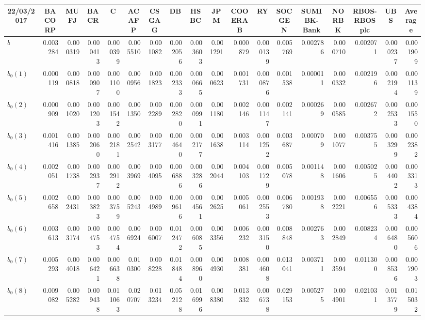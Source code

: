\documentclass[12pt,a4paper]{article}
\theoremstyle{plain}
\numberwithin{equation}{section}
\begin{document}
\begin{table}[t]
\begin{subtable}{.5\textwidth}
{  \begin{tabular}{|l|rrrrrrrrrrrrrrrr|r|}
    \toprule
    \multicolumn{1}{|c|}{22/03/2017} & \multicolumn{1}{c}{BACORP} & \multicolumn{1}{c}{MUFJ} & \multicolumn{1}{c}{BACR} & \multicolumn{1}{c}{C} & \multicolumn{1}{c}{ACAFP} & \multicolumn{1}{c}{CSGAG} & \multicolumn{1}{c}{DB} & \multicolumn{1}{c}{HSBC} & \multicolumn{1}{c}{JPM} & \multicolumn{1}{c}{COOERAB} & \multicolumn{1}{c}{RY} & \multicolumn{1}{c}{SOCGEN} & \multicolumn{1}{c}{SUMIBK-Bank} & \multicolumn{1}{c}{NORBK} & \multicolumn{1}{c}{RBOS-RBOSplc} & \multicolumn{1}{c|}{UBS} & \multicolumn{1}{c|}{\textbf{Average}} \\
    \midrule
     $\hat{b}$     & 0.003284 & 0.000319 & 0.000413 & 0.000399 & 0.005510 & 0.001082 & 0.002056 & 0.003603 & 0.001291 & 0.000879 & 0.000139 & 0.005769 & 0.002786 & 0.000710 & 0.002071 & 0.000237 & 0.001909 \\
     $\hat{b}_0(1)$  & 0.000119 & 0.000818 & 0.000907 & 0.001100 & 0.000956 & 0.001823 & 0.002333 & 0.000665 & 0.000623 & 0.001731 & 0.000876 & 0.001538 & 0.000011 & 0.000332 & 0.002196 & 0.002194 & 0.001139 \\
     $\hat{b}_0(2)$   & 0.000909 & 0.001020 & 0.001203 & 0.001542 & 0.001350 & 0.002289 & 0.002820 & 0.000991 & 0.001180 & 0.002146 & 0.001147 & 0.002141 & 0.000269 & 0.000585 & 0.002672 & 0.002533 & 0.001550 \\
     $\hat{b}_0(3)$  & 0.001416 & 0.001385 & 0.002060 & 0.002181 & 0.002542 & 0.003177 & 0.004640 & 0.002177 & 0.001638 & 0.003114 & 0.001252 & 0.003687 & 0.000709 & 0.001077 & 0.003755 & 0.003299 & 0.002382 \\
    $\hat{b}_0(4)$   & 0.002051 & 0.001738 & 0.002937 & 0.002912 & 0.003969 & 0.004095 & 0.006886 & 0.003286 & 0.002044 & 0.004103 & 0.001729 & 0.005078 & 0.001148 & 0.001606 & 0.005025 & 0.004402 & 0.003313 \\
     $\hat{b}_0(5)$  & 0.002658 & 0.002431 & 0.003823 & 0.003759 & 0.005243 & 0.004989 & 0.009616 & 0.004561 & 0.002625 & 0.005061 & 0.002553 & 0.006780 & 0.001938 & 0.002221 & 0.006556 & 0.005333 & 0.004384 \\
     $\hat{b}_0(6)$  & 0.003613 & 0.003174 & 0.004753 & 0.004754 & 0.006924 & 0.006007 & 0.012472 & 0.006085 & 0.003356 & 0.006232 & 0.003150 & 0.008848 & 0.002763 & 0.002849 & 0.008234 & 0.006480 & 0.005606 \\
    $\hat{b}_0(7)$  & 0.005293 & 0.004018 & 0.006421 & 0.006638 & 0.010300 & 0.008228 & 0.018484 & 0.008960 & 0.004930 & 0.008381 & 0.004608 & 0.013041 & 0.003711 & 0.003594 & 0.011300 & 0.008536 & 0.007903 \\
    $\hat{b}_0(8)$  & 0.009082 & 0.005282 & 0.009438 & 0.011063 & 0.020707 & 0.013234 & 0.052128 & 0.016996 & 0.008380 & 0.013332 & 0.006738 & 0.029153 & 0.005275 & 0.004901 & 0.021031 & 0.013779 & 0.015032 \\
    \bottomrule
    \end{tabular}%

}
\end{subtable}
\end{table}
\end{document}
